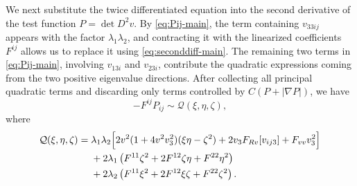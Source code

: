 \documentclass{article}
\numberwithin{equation}{section}
\begin{document}
We next substitute the twice differentiated equation into the
second derivative of the test function \(P=\det D^2v\).
By \eqref{eq:Pij-main}, the term containing \(v_{33ij}\) appears with the factor
\(\lambda_1\lambda_2\), and contracting it with the linearized
coefficients \(F^{ij}\) allows us to replace it using  \eqref{eq:seconddiff-main}.
The remaining two terms in \eqref{eq:Pij-main}, involving
\(v_{13i}\) and \(v_{23i}\), contribute the quadratic expressions
coming from the two positive eigenvalue directions.
After collecting all principal quadratic terms and discarding only
terms controlled by \(C(P+|\nabla P|)\), we have
\begin{equation}\label{eq:Q3-main}
-F^{ij}P_{ij}\sim\mathcal Q(\xi,\eta,\zeta),
\end{equation}
where
\begin{align}
\mathcal Q(\xi,\eta,\zeta)
={}&\lambda_1\lambda_2
\Bigl[
2v^2(1+4v^2v_3^2)(\xi\eta-\zeta^2)
+2v_3F_{Rv}[v_{ij3}]+F_{vv}v_3^2
\Bigr]
\notag\\
&+2\lambda_1\left(F^{11}\zeta^2+2F^{12}\zeta\eta+F^{22}\eta^2\right)
\notag\\
&+2\lambda_2\left(F^{11}\xi^2+2F^{12}\xi\zeta+F^{22}\zeta^2\right).
\label{eq:Q3-expanded-main}
\end{align}
\end{document}
